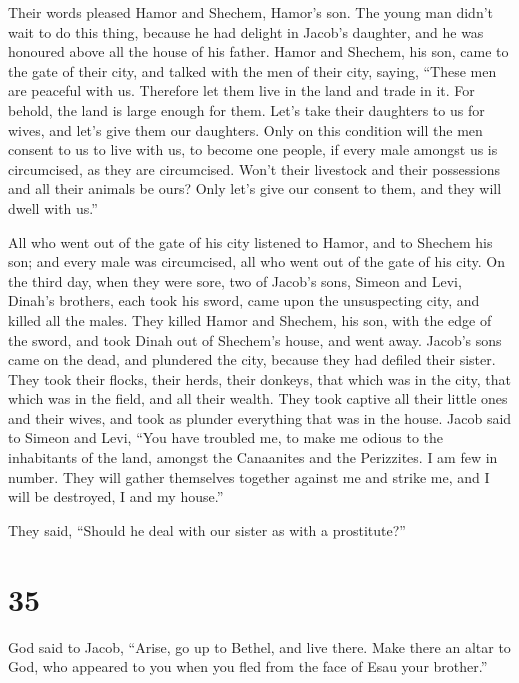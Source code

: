  Their words pleased Hamor and Shechem, Hamor's son.
 The young man didn't wait to do this thing, because he had
delight in Jacob's daughter, and he was honoured above all the house of
his father.  Hamor and Shechem, his son, came to the gate
of their city, and talked with the men of their city, saying,
 ``These men are peaceful with us. Therefore let them live
in the land and trade in it. For behold, the land is large enough for
them. Let's take their daughters to us for wives, and let's give them
our daughters.  Only on this condition will the men consent
to us to live with us, to become one people, if every male amongst us is
circumcised, as they are circumcised.  Won't their
livestock and their possessions and all their animals be ours? Only
let's give our consent to them, and they will dwell with us.''

 All who went out of the gate of his city listened to
Hamor, and to Shechem his son; and every male was circumcised, all who
went out of the gate of his city.  On the third day, when
they were sore, two of Jacob's sons, Simeon and Levi, Dinah's brothers,
each took his sword, came upon the unsuspecting city, and killed all the
males.  They killed Hamor and Shechem, his son, with the
edge of the sword, and took Dinah out of Shechem's house, and went away.
 Jacob's sons came on the dead, and plundered the city,
because they had defiled their sister.  They took their
flocks, their herds, their donkeys, that which was in the city, that
which was in the field,  and all their wealth. They took
captive all their little ones and their wives, and took as plunder
everything that was in the house.  Jacob said to Simeon and
Levi, ``You have troubled me, to make me odious to the inhabitants of
the land, amongst the Canaanites and the Perizzites. I am few in number.
They will gather themselves together against me and strike me, and I
will be destroyed, I and my house.''

 They said, ``Should he deal with our sister as with a
prostitute?''

\hypertarget{section-34}{%
\section{35}\label{section-34}}

 God said to Jacob, ``Arise, go up to Bethel, and live
there. Make there an altar to God, who appeared to you when you fled
from the face of Esau your brother.''

